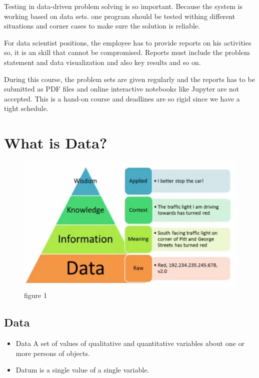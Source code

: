 \documentclass[twocolumn,a4paper, 10pt]{article}
\begin{document}
	Testing in data-driven problem solving is so important. Because the system is working based on data sets.
	one program should be tested withing different situations and corner cases to make sure the solution is
	reliable.

	For data scientist positions, the employee has to provide reports on his activities so, 
	it is an skill that cannot be compromised. Reports must include the problem statement and
	data visualization and also key results and so on. 

	During this course, the problem sets are given regularly and the reports has to be submitted 
	as PDF files and online interactive notebooks like Jupyter are not accepted. This is a hand-on course and
	deadlines are so rigid since we have a tight schedule. 

	
	\section{What is Data?}

	\begin{figure}[h]
		\centering
		\includegraphics[scale=0.45]{./img/fig1.png}
		\caption{figure 1}
	\end{figure}

	\subsection{Data}
	\begin{itemize}
		\item Data A set of values of qualitative and quantitative variables about one or more persons of objects.
		\item Datum is  a single value of a single variable.
	\end{itemize}
\end{document}
